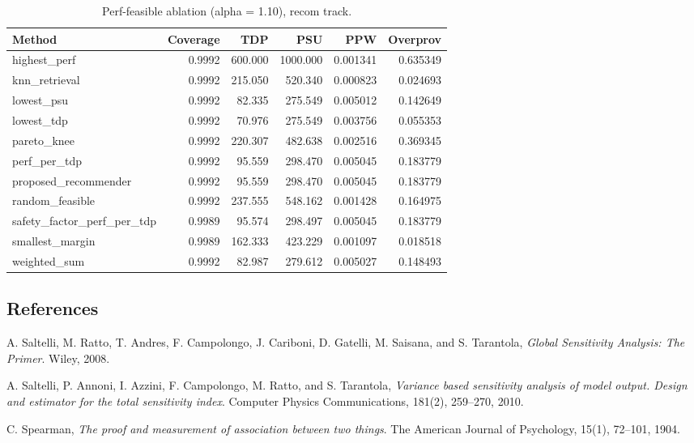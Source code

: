 \begin{table}[t]
\centering
\small
\caption{Perf-feasible ablation (alpha = 1.10), recom track.}
\label{tab:perf_alpha_recom}
\begin{tabular}{lrrrrr}
\hline
Method & Coverage & TDP & PSU & PPW & Overprov \\
\hline
highest\_perf & 0.9992 & 600.000 & 1000.000 & 0.001341 & 0.635349 \\
knn\_retrieval & 0.9992 & 215.050 & 520.340 & 0.000823 & 0.024693 \\
lowest\_psu & 0.9992 & 82.335 & 275.549 & 0.005012 & 0.142649 \\
lowest\_tdp & 0.9992 & 70.976 & 275.549 & 0.003756 & 0.055353 \\
pareto\_knee & 0.9992 & 220.307 & 482.638 & 0.002516 & 0.369345 \\
perf\_per\_tdp & 0.9992 & 95.559 & 298.470 & 0.005045 & 0.183779 \\
proposed\_recommender & 0.9992 & 95.559 & 298.470 & 0.005045 & 0.183779 \\
random\_feasible & 0.9992 & 237.555 & 548.162 & 0.001428 & 0.164975 \\
safety\_factor\_perf\_per\_tdp & 0.9989 & 95.574 & 298.497 & 0.005045 & 0.183779 \\
smallest\_margin & 0.9989 & 162.333 & 423.229 & 0.001097 & 0.018518 \\
weighted\_sum & 0.9992 & 82.987 & 279.612 & 0.005027 & 0.148493 \\
\hline
\end{tabular}
\end{table}

\subsection*{References}
\begin{thebibliography}{9}
A. Saltelli, M. Ratto, T. Andres, F. Campolongo, J. Cariboni, D. Gatelli, M. Saisana, and S. Tarantola, \emph{Global Sensitivity Analysis: The Primer}. Wiley, 2008.

A. Saltelli, P. Annoni, I. Azzini, F. Campolongo, M. Ratto, and S. Tarantola, \emph{Variance based sensitivity analysis of model output. Design and estimator for the total sensitivity index}. Computer Physics Communications, 181(2), 259--270, 2010.

C. Spearman, \emph{The proof and measurement of association between two things}. The American Journal of Psychology, 15(1), 72--101, 1904.
\end{thebibliography}
